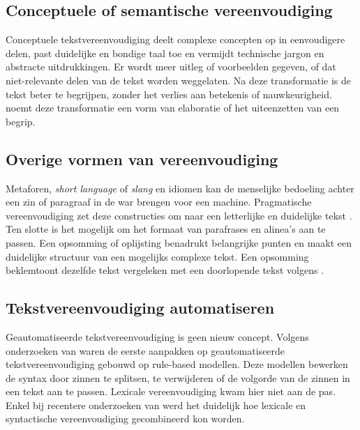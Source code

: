 
\subsection{Conceptuele of semantische vereenvoudiging}

Conceptuele tekstvereenvoudiging deelt complexe concepten op in eenvoudigere delen, past duidelijke en bondige taal toe en vermijdt technische jargon en abstracte uitdrukkingen. Er wordt meer uitleg of voorbeelden gegeven, of dat niet-relevante delen van de tekst worden weggelaten. Na deze transformatie is de tekst beter te begrijpen, zonder het verlies aan betekenis of nauwkeurigheid. \textcite{Siddharthan2014} noemt deze transformatie een vorm van elaboratie of het uiteenzetten van een begrip.

\subsection{Overige vormen van vereenvoudiging}

Metaforen, \textit{short language} of \textit{slang} en idiomen kan de menselijke bedoeling achter een zin of paragraaf in de war brengen voor een machine. Pragmatische vereenvoudiging zet deze constructies om naar een letterlijke en duidelijke tekst \autocite{JavoureyDrevet2022}. Ten slotte is het mogelijk om het formaat van parafrases en alinea's aan te passen. Een opsomming of oplijsting benadrukt belangrijke punten en maakt een duidelijke structuur van een mogelijks complexe tekst. Een opsomming beklemtoont dezelfde tekst vergeleken met een doorlopende tekst volgens \textcite{Siddharthan2014, Hale2022}. 

\subsection{Tekstvereenvoudiging automatiseren}

Geautomatiseerde tekstvereenvoudiging is geen nieuw concept. Volgens onderzoeken van \textcite{Canning2000, Siddharthan2006} waren de eerste aanpakken op geautomatiseerde tekstvereenvoudiging gebouwd op rule-based modellen. Deze modellen bewerken de syntax door zinnen te splitsen, te verwijderen of de volgorde van de zinnen in een tekst aan te passen. Lexicale vereenvoudiging kwam hier niet aan de pas. Enkel bij recentere onderzoeken van \textcite{Coster2011, Bulte2018} werd het duidelijk hoe lexicale en syntactische vereenvoudiging gecombineerd kon worden.

